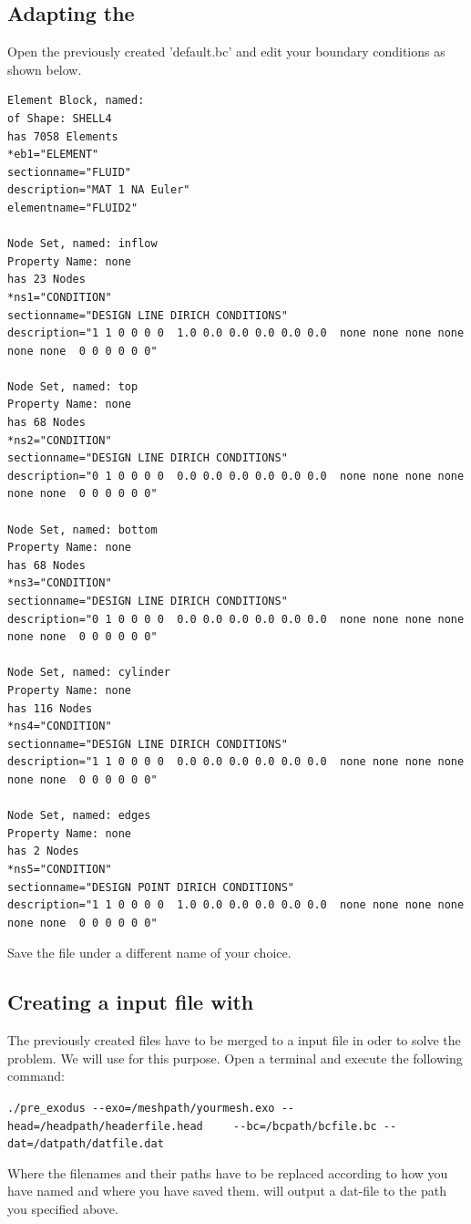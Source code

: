 \subsection{Adapting the \bc}
Open the previously created \bc 'default.bc' and edit your boundary conditions as shown below.


 \begin{small} \begin{verbatim}
Element Block, named: 
of Shape: SHELL4
has 7058 Elements
*eb1="ELEMENT"
sectionname="FLUID"
description="MAT 1 NA Euler"
elementname="FLUID2"

Node Set, named: inflow
Property Name: none
has 23 Nodes
*ns1="CONDITION"
sectionname="DESIGN LINE DIRICH CONDITIONS"
description="1 1 0 0 0 0  1.0 0.0 0.0 0.0 0.0 0.0  none none none none none none  0 0 0 0 0 0"

Node Set, named: top
Property Name: none
has 68 Nodes
*ns2="CONDITION"
sectionname="DESIGN LINE DIRICH CONDITIONS"
description="0 1 0 0 0 0  0.0 0.0 0.0 0.0 0.0 0.0  none none none none none none  0 0 0 0 0 0"

Node Set, named: bottom
Property Name: none
has 68 Nodes
*ns3="CONDITION"
sectionname="DESIGN LINE DIRICH CONDITIONS"
description="0 1 0 0 0 0  0.0 0.0 0.0 0.0 0.0 0.0  none none none none none none  0 0 0 0 0 0"

Node Set, named: cylinder
Property Name: none
has 116 Nodes
*ns4="CONDITION"
sectionname="DESIGN LINE DIRICH CONDITIONS"
description="1 1 0 0 0 0  0.0 0.0 0.0 0.0 0.0 0.0  none none none none none none  0 0 0 0 0 0"

Node Set, named: edges
Property Name: none
has 2 Nodes
*ns5="CONDITION"
sectionname="DESIGN POINT DIRICH CONDITIONS"
description="1 1 0 0 0 0  1.0 0.0 0.0 0.0 0.0 0.0  none none none none none none  0 0 0 0 0 0"
 \end{verbatim} \end{small}
Save the file under a different name of your choice.

\subsection{Creating a \baci{} input file with \prexo}
The previously created files have to be merged to a \baci{} input file in oder 
to solve the problem. We will use \prexo for this purpose. Open a terminal 
and execute the following command:
\begin{center}
  \verb|./pre_exodus --exo=/meshpath/yourmesh.exo --head=/headpath/headerfile.head|
  \verb|	--bc=/bcpath/bcfile.bc --dat=/datpath/datfile.dat|
\end{center}
Where the filenames and their paths have to be replaced according to how you have named and where you have saved them.
\prexo will output a dat-file to the path you specified above.


